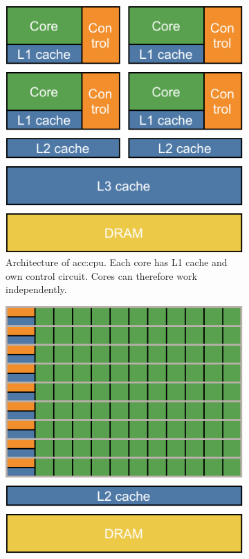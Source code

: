 \begin{figure}
    \begin{subfigure}[t]{0.47\textwidth}
        \includegraphics[width=\textwidth]{img/master_cpu_arch.pdf}
        \caption{Architecture of \acrshort*{acc:cpu}. Each core has L1 cache and own control circuit. Cores can therefore work independently.}
        \label{fig:cpuarch}
    \end{subfigure}
    \hfill
    \begin{subfigure}[t]{0.47\textwidth}
        \includegraphics[width=\textwidth]{img/master_gpu_arch.pdf}

\end{subfigure}
\end{figure}
